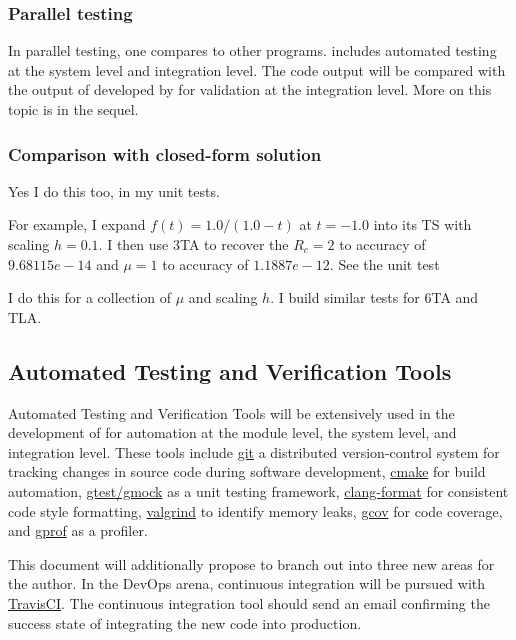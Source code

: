 \documentclass[12pt, titlepage]{article}
\begin{document}
\subsubsection{Parallel testing}
In parallel testing, one compares to other programs.
 includes automated testing at the system level
and integration level. The code output
will be compared with the output of \rdcon developed by \cite{chang1982} for validation at
the integration level. More on this topic is in the sequel.

\subsubsection{Comparison with closed-form solution}
Yes I do this too, in my unit tests.

For example, I expand $f(t) = 1.0/(1.0-t)$ at
$t =-1.0$ into its TS with scaling $h=0.1$. I then use 3TA to recover the $R_c = 2$ to accuracy of
$9.68115e-14$ and $\mu = 1$ to accuracy of $1.1887e-12$. See the unit test
\EQ
{
}

\Ni I do this for a collection of $\mu$ and scaling $h$. 
I build similar tests for 6TA and TLA.

\subsection{Automated Testing and Verification Tools}

Automated Testing and Verification Tools will be extensively used in the development of 
for automation at the module level, the system level, and integration level.
These tools include
\href{https://git.kernel.org/pub/scm/git/git.git}{git} a distributed version-control system
for tracking changes in source code during software development,
\href{https://cmake.org/}{cmake} for build automation,
\href{https://github.com/google/googletest}{gtest/gmock}
as a unit testing framework, \href{http://clang.llvm.org/docs/ClangFormat.html}{clang-format}
for consistent code style formatting, \href{https://www.valgrind.org}{valgrind}
to identify memory leaks, \href{https://en.wikipedia.org/wiki/Gcov}{gcov} for code coverage,
and \href{https://en.wikipedia.org/wiki/Gprof}{gprof} as a profiler.

This document will additionally propose to branch out into three new areas for the author.
In the DevOps arena,
continuous integration will be pursued with \href{https://travis-ci.org}{TravisCI}.
The continuous integration tool should send an email confirming the success state
of integrating the new code into production.
\end{document}
